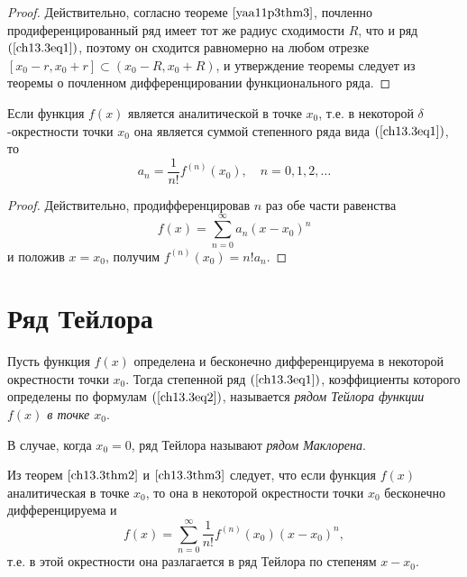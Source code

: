 \begin{proof}
Действительно, согласно теореме $\ref{yaa11p3thm3}$, почленно продиференцированный ряд имеет тот же радиус сходимости $R$, что и ряд $(\ref{ch13.3eq1})$, поэтому он сходится равномерно на любом отрезке $[x_0 - r, x_0 + r] \subset (x_0 - R, x_0 + R)$, и утверждение теоремы следует из теоремы о почленном дифференцировании функционального ряда.
\end{proof}

\begin{thm} \label{ch13.3thm3}
Если функция $f(x)$ является аналитической в точке $x_0$, т.е. в некоторой $\delta$-окрестности точки $x_0$ она является суммой степенного ряда вида $(\ref{ch13.3eq1})$, то
\begin{equation} \label{ch13.3eq2}
a_n = \frac{1}{n!} f^{(n)}(x_0), \quad n = 0, 1, 2, \ldots
\end{equation}
\end{thm}
\begin{proof}
Действительно, продифференцировав $n$ раз обе части равенства
$$
f(x) = \sum\limits_{n = 0}^{\infty} a_n(x - x_0)^n
$$
и положив $x = x_0$, получим $f^{(n)}(x_0) = n! a_n$.
\end{proof}
\section{Ряд Тейлора}

\begin{defn}
Пусть функция $f(x)$ определена и бесконечно дифференцируема в некоторой окрестности точки $x_0$. Тогда степенной ряд $(\ref{ch13.3eq1})$, коэффициенты которого определены по формулам $(\ref{ch13.3eq2})$, называется \textit{рядом Тейлора функции $f(x)$ в точке $x_0$}.

В случае, когда $x_0 = 0$, ряд Тейлора называют \textit{рядом Маклорена}.

Из теорем $\ref{ch13.3thm2}$ и $\ref{ch13.3thm3}$ следует, что если функция $f(x)$ аналитическая в точке $x_0$, то она в некоторой окрестности точки $x_0$ бесконечно дифференцируема и
$$
f(x) = \sum\limits_{n = 0}^{\infty} \frac{1}{n!}f^{(n)}(x_0)(x - x_0)^n,
$$
т.е. в этой окрестности она разлагается в ряд Тейлора по степеням $x - x_0$.
\end{defn}

